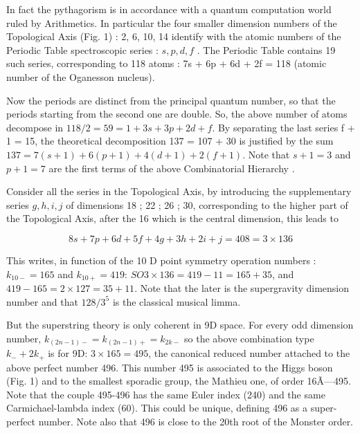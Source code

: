 \documentclass[a4paper,9pt]{article}
\begin{document}
     In fact the pythagorism is in accordance with a quantum computation world ruled by Arithmetics. In particular the four smaller dimension numbers of the Topological Axis (Fig. 1) : 2, 6, 10, 14 identify with the atomic numbers of the Periodic Table spectroscopic series : $s, p, d, f$ . The Periodic Table contains 19 such series, corresponding to 118 atoms : 7s + 6p + 6d + 2f = 118 (atomic number of the Oganesson nucleus). 
     

     Now the periods are distinct from the principal quantum number, so that the periods starting from the second one are double. So, the above number of atoms decompose in $118/2 = 59 = 1 + 3s + 3p + 2d + f$.  By separating the last series f + 1 = 15, the theoretical decomposition 137 = 107 + 30 is justified by the sum $137 = 7(s +1) + 6(p +1) + 4(d +1) + 2(f +1)$. Note that $s + 1 = 3$ and $p + 1 = 7$ are the first terms of the above Combinatorial Hierarchy\cite{Bastin} .



     Consider all the series in the Topological Axis, by introducing the supplementary series $g, h, i, j$ of dimensions 18 ; 22 ; 26 ; 30, corresponding to the higher part of the Topological Axis, after the 16 which is the central dimension, this leads to
     
     \begin{equation}
      8s + 7p + 6 d + 5f + 4g + 3h + 2i + j = 408 = 3 \times 136   
     \end{equation}
      
     
     This writes, in function of the 10 D point symmetry operation numbers :  $k_{10-} = 165$ and $k_{10+} = 419$: $SO3 \times 136 = 419 - 11 = 165 + 35$, and $419-165 = 2 \times 127 =  35 + 11$. Note that the later is the supergravity dimension number and that $128/3^5$ is the classical musical limma. 
     
     
     But the superstring theory is only coherent in 9D space. For every odd dimension number, $k_{(2n - 1)-} = k_{(2n - 1)+} = k_{2k-}$ so the above combination type $k_- + 2k_+$ is for 9D: $3 \times 165 = 495$, the canonical reduced number attached to the above perfect number 496. This number 495 is associated to the Higgs boson (Fig. 1) and to the smallest sporadic group, the Mathieu one, of order 16Ã—495. Note that the couple 495-496 has the same Euler index (240) and the same Carmichael-lambda index (60). This could be unique, defining 496 as a super-perfect number. Note also that 496 is close to the 20th root of the Monster order.
     
\end{document}
